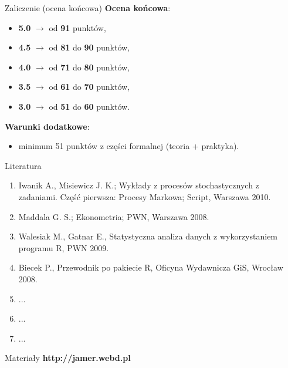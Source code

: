 \documentclass[a4paper, 11pt]{beamer}
\begin{document}
	\begin{frame}{Zaliczenie (ocena końcowa)}
		\textbf{Ocena końcowa}:
		\begin{itemize}
			\item \textbf{5.0} $\rightarrow$ od \textbf{91} punktów,
			\item \textbf{4.5} $\rightarrow$ od \textbf{81} do \textbf{90} punktów,
			\item \textbf{4.0} $\rightarrow$ od \textbf{71} do \textbf{80} punktów,
			\item \textbf{3.5} $\rightarrow$ od \textbf{61} do \textbf{70} punktów,
			\item \textbf{3.0} $\rightarrow$ od \textbf{51} do \textbf{60} punktów.
		\end{itemize}
		\textbf{Warunki dodatkowe}:
		\begin{itemize}
			\item minimum 51 punktów z części formalnej (teoria + praktyka).
		\end{itemize}
	\end{frame}
	
	\begin{frame}{Literatura}
		\begin{enumerate}
			\item Iwanik A., Misiewicz J. K.; Wykłady z procesów stochastycznych z zadaniami. Część pierwsza: Procesy Markowa; Script, Warszawa 2010.
			\item Maddala G. S.; Ekonometria; PWN, Warszawa 2008.
			\item Walesiak M., Gatnar E., Statystyczna analiza danych z wykorzystaniem programu R, PWN 2009.
			\item Biecek P., Przewodnik po pakiecie R, Oficyna Wydawnicza GiS, Wrocław 2008.
			\item ...
			\item ...
			\item ...
		\end{enumerate}
	\end{frame}
	
	\begin{frame}{Materiały}
		\Huge\bfseries
		\centering
		http://jamer.webd.pl
	\end{frame}
\end{document}
